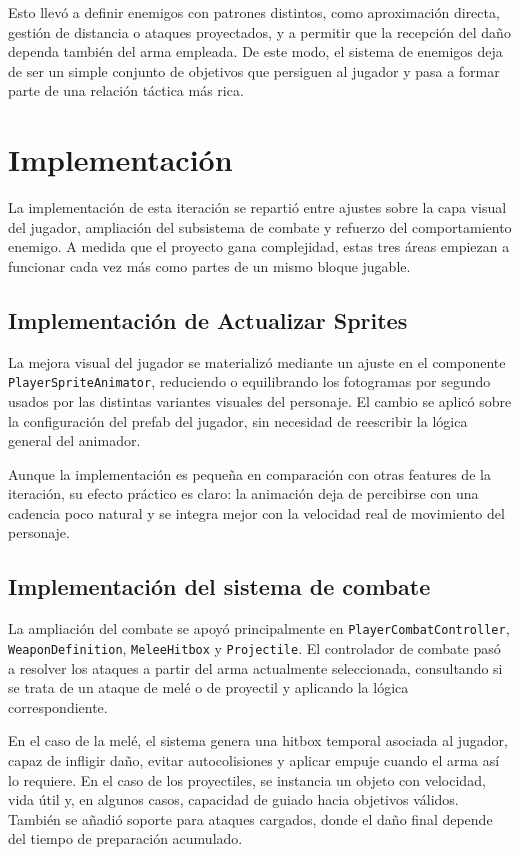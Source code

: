 Esto llevó a definir enemigos con patrones distintos, como aproximación directa, gestión de
distancia o ataques proyectados, y a permitir que la recepción del daño dependa también del
arma empleada. De este modo, el sistema de enemigos deja de ser un simple conjunto de
objetivos que persiguen al jugador y pasa a formar parte de una relación táctica más rica.

\section{Implementación}
La implementación de esta iteración se repartió entre ajustes sobre la capa visual del
jugador, ampliación del subsistema de combate y refuerzo del comportamiento enemigo. A
medida que el proyecto gana complejidad, estas tres áreas empiezan a funcionar cada vez más
como partes de un mismo bloque jugable.

\subsection{Implementación de Actualizar Sprites}
La mejora visual del jugador se materializó mediante un ajuste en el componente
\texttt{PlayerSpriteAnimator}, reduciendo o equilibrando los fotogramas por segundo usados
por las distintas variantes visuales del personaje. El cambio se aplicó sobre la
configuración del prefab del jugador, sin necesidad de reescribir la lógica general del
animador.

Aunque la implementación es pequeña en comparación con otras features de la iteración, su
efecto práctico es claro: la animación deja de percibirse con una cadencia poco natural y
se integra mejor con la velocidad real de movimiento del personaje.

\subsection{Implementación del sistema de combate}
La ampliación del combate se apoyó principalmente en \texttt{PlayerCombatController},
\texttt{WeaponDefinition}, \texttt{MeleeHitbox} y \texttt{Projectile}. El controlador de
combate pasó a resolver los ataques a partir del arma actualmente seleccionada, consultando
si se trata de un ataque de melé o de proyectil y aplicando la lógica correspondiente.

En el caso de la melé, el sistema genera una hitbox temporal asociada al jugador, capaz de
infligir daño, evitar autocolisiones y aplicar empuje cuando el arma así lo requiere. En el
caso de los proyectiles, se instancia un objeto con velocidad, vida útil y, en algunos
casos, capacidad de guiado hacia objetivos válidos. También se añadió soporte para ataques
cargados, donde el daño final depende del tiempo de preparación acumulado.

